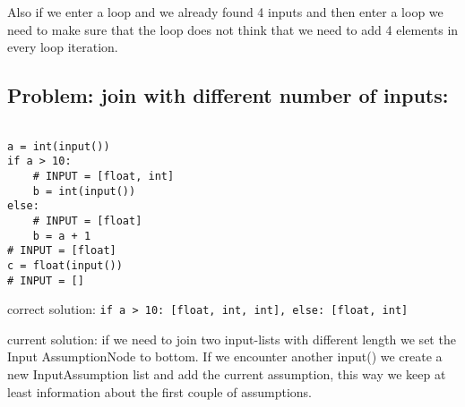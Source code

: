\documentclass[11pt]{article}
\begin{document}
Also if we enter a loop and we already found 4 inputs and then enter a loop we need to make sure that the loop does not think that we need to add 4 elements in every loop iteration.

\subsection{Problem: join with different number of inputs:}

\begin{lstlisting}[numbers=none]

a = int(input())
if a > 10:
    # INPUT = [float, int]
    b = int(input())
else:
    # INPUT = [float]
    b = a + 1
# INPUT = [float]
c = float(input())
# INPUT = []
\end{lstlisting}

correct solution: \verb|if a > 10: [float, int, int], else: [float, int]|

current solution: if we need to join two input-lists with different length we set the Input AssumptionNode to bottom. If we encounter another input() we create a new InputAssumption list and add the current assumption, this way we keep at least information about the first couple of assumptions.
\end{document}
